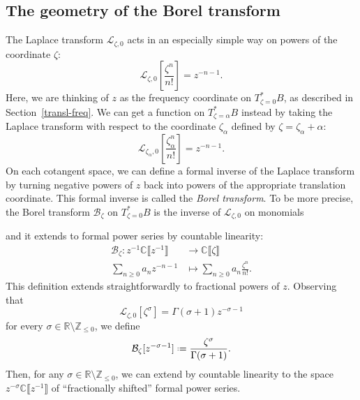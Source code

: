 \documentclass{article}
\newcommand{\maps}{\colon}
\newcommand{\Z}{\mathbb{Z}}
\newcommand{\R}{\mathbb{R}}
\newcommand{\C}{\mathbb{C}}
\newcommand*{\defeq}{\mathrel{\vcenter{\baselineskip0.5ex \lineskiplimit0pt
                     \hbox{\scriptsize.}\hbox{\scriptsize.}}}%
                     =}
\newcommand{\laplace}{\mathcal{L}}
\newcommand{\borel}{\mathcal{B}}
\theoremstyle{definition}
\theoremstyle{plain}
\begin{document}
\subsection{The geometry of the Borel transform}\label{sec:geometry_borel}
%
The Laplace transform $\laplace_{\zeta, 0}$ acts in an especially simple way on powers of the coordinate $\zeta$:
\[ \laplace_{\zeta, 0}\left[\frac{\zeta^n}{n!}\right] = z^{-n-1}. \]
Here, we are thinking of $z$ as the frequency coordinate on $T^*_{\zeta = 0}B$, as described in Section~\ref{transl-freq}. We can get a function on $T^*_{\zeta = \alpha}B$ instead by taking the Laplace transform with respect to the coordinate $\zeta_\alpha$ defined by $\zeta = \zeta_\alpha + \alpha$:
\[ \laplace_{\zeta_\alpha, 0}\left[\frac{\zeta_\alpha^n}{n!}\right] = z^{-n-1}. \]
On each cotangent space, we can define a formal inverse of the Laplace transform by turning negative powers of $z$ back into powers of the appropriate translation coordinate. This formal inverse is called the {\em Borel transform}. To be more precise, the Borel transform $\borel_\zeta$ on $T^*_{\zeta = 0}B$ is the inverse of $\laplace_{\zeta,0}$ on monomials 
\begin{center}
\end{center}
and it extends to formal power series by countable linearity:
\begin{align*}
\borel_\zeta \maps z^{-1} \C \llbracket z^{-1} \rrbracket & \to \C \llbracket \zeta \rrbracket \\
\sum_{n \ge 0} a_n z^{-n-1} & \mapsto \sum_{n \ge 0} a_n \frac{\zeta^n}{n!}.
\end{align*}
This definition extends straightforwardly to fractional powers of $z$. Observing that   
\[\laplace_{\zeta,0}[\zeta^\sigma]=\Gamma(\sigma+1)z^{-\sigma-1}\]
for every $\sigma \in \R \setminus \Z_{\leq 0}$, we define 
\begin{align*}
\borel_\zeta[z^{-\sigma-1}] \defeq \frac{\zeta^{\sigma}}{\Gamma(\sigma+1)}.
\end{align*}
Then, for any $\sigma \in \R \setminus \Z_{\leq 0}$, we can extend by countable linearity to the space $z^{-\sigma}\C\llbracket z^{-1}\rrbracket$ of ``fractionally shifted'' formal power series.
\end{document}
